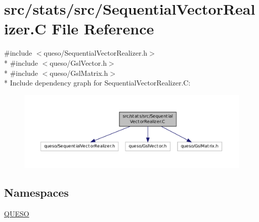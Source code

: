 \hypertarget{_sequential_vector_realizer_8_c}{\section{src/stats/src/\-Sequential\-Vector\-Realizer.C File Reference}
\label{_sequential_vector_realizer_8_c}
}
{\ttfamily \#include $<$queso/\-Sequential\-Vector\-Realizer.\-h$>$}\\*
{\ttfamily \#include $<$queso/\-Gsl\-Vector.\-h$>$}\\*
{\ttfamily \#include $<$queso/\-Gsl\-Matrix.\-h$>$}\\*
Include dependency graph for Sequential\-Vector\-Realizer.\-C\-:
\nopagebreak
\begin{figure}[H]
\begin{center}
\leavevmode
\includegraphics[width=350pt]{_sequential_vector_realizer_8_c__incl}
\end{center}
\end{figure}
\subsection*{Namespaces}
\begin{DoxyCompactItemize}
\item 
\hyperlink{namespace_q_u_e_s_o}{Q\-U\-E\-S\-O}
\end{DoxyCompactItemize}
